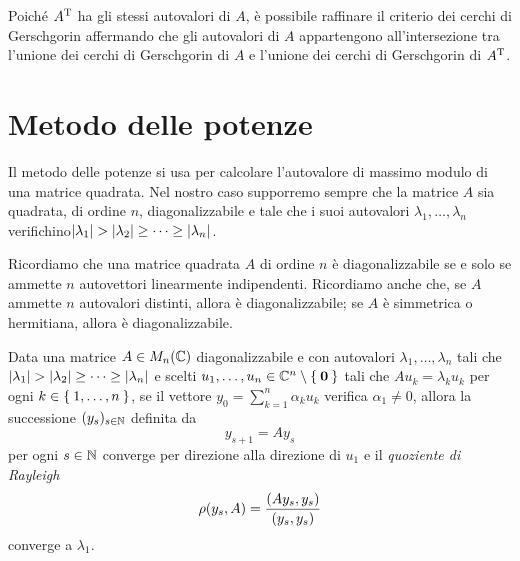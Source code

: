 	\begin{osservazione}
		Poiché \(A^\mathrm{T}\relax\) ha gli stessi autovalori di \(A\), è possibile raffinare il criterio dei cerchi di Gerschgorin affermando che gli autovalori di \(A\) appartengono all'intersezione tra l'unione dei cerchi di Gerschgorin di \(A\) e l'unione dei cerchi di Gerschgorin di \(A^\mathrm{T}\relax\).
	\end{osservazione}

\section{Metodo delle potenze}
	
	\noindent Il metodo delle potenze si usa per calcolare l'autovalore di massimo modulo di una matrice quadrata. Nel nostro caso supporremo sempre che la matrice \(A\) sia quadrata, di ordine \(n\), diagonalizzabile e tale che i suoi autovalori \(\lambda_1, \dots, \lambda_n\) verifichino\(\abs{\lambda_1} > \abs{\lambda_2} \ge \dots \ge \abs{\lambda_n}\).
	
	Ricordiamo che una matrice quadrata \(A\) di ordine \(n\) è diagonalizzabile se e solo se ammette \(n\) autovettori linearmente indipendenti. Ricordiamo anche che, se \(A\) ammette \(n\) autovalori distinti, allora è diagonalizzabile; se \(A\) è simmetrica o hermitiana, allora è diagonalizzabile.
	
	\begin{teorema}\label{th:metodo-potenze-converge}
		Data una matrice \(A \in M_n (\mathbb{C})\) diagonalizzabile e con autovalori \(\lambda_1, \dots, \lambda_n\) tali che \(\abs{\lambda_1} > \abs{\lambda_2} \ge \dots \ge \abs{\lambda_n}\) e scelti \(u_1, \dots, u_n \in \mathbb{C}^n \setminus \Set{\mathbf{0}}\) tali che \(A u_k = \lambda_k u_k\) per ogni \(k \in \Set{1, \dots, n}\), se il vettore \(y_0 = \sum_{k = 1}^n \alpha_k u_k\) verifica \(\alpha_1 \ne 0\), allora la successione \((y_s)_{s \in \mathbb{N}}\) definita da
		\begin{equation}
			y_{s + 1} = A y_s
		\end{equation}
		per ogni \(s \in \mathbb{N}\) converge per direzione alla direzione di \(u_1\) e il \emph{quoziente di Rayleigh}
		\begin{equation}
			\operatorname{\rho} (y_s, A) = \frac{(A y_s, y_s)}{(y_s, y_s)}
		\end{equation}
		converge a \(\lambda_1\).
	\end{teorema}